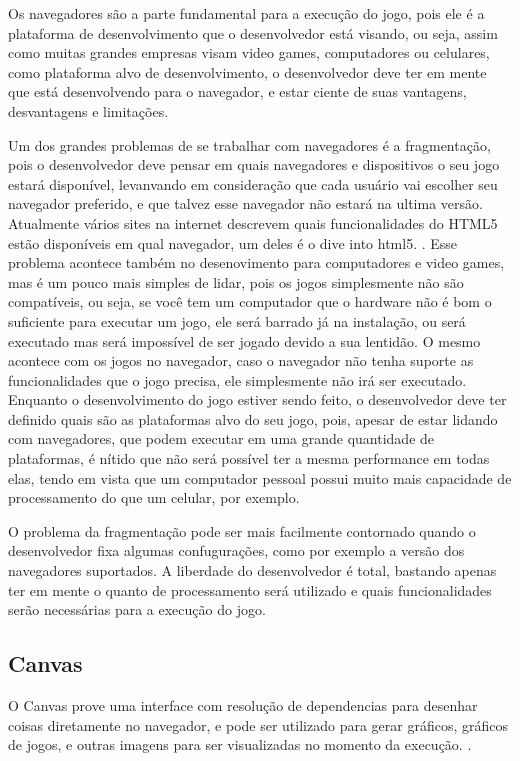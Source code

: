 Os navegadores são a parte fundamental para a execução do jogo, pois
ele é a plataforma de desenvolvimento que o desenvolvedor está visando,
ou seja, assim como muitas grandes empresas visam video games,
computadores ou celulares, como plataforma alvo de desenvolvimento, o
desenvolvedor deve ter em mente que está desenvolvendo para o
navegador, e estar ciente de suas vantagens, desvantagens e
limitações.

Um dos grandes problemas de se trabalhar com navegadores é a
fragmentação, pois o desenvolvedor deve pensar em quais navegadores e
dispositivos o seu jogo estará disponível, levanvando em consideração
que cada usuário vai escolher seu navegador preferido, e que talvez
esse navegador não estará na ultima versão. Atualmente vários sites na
internet descrevem quais funcionalidades do HTML5 estão disponíveis em
qual navegador, um deles é o dive into html5. \cite{diveintohtml5}.
Esse problema acontece também no desenovimento para computadores e
video games, mas é um pouco mais simples de lidar, pois os jogos
simplesmente não são compatíveis, ou seja, se você tem um computador
que o hardware não é bom o suficiente para executar um jogo, ele será
barrado já na instalação, ou será executado mas será impossível de ser
jogado devido a sua lentidão. O mesmo acontece com os jogos no
navegador, caso o navegador não tenha suporte as funcionalidades que o
jogo precisa, ele simplesmente não irá ser executado. Enquanto o
desenvolvimento do jogo estiver sendo feito, o desenvolvedor deve ter
definido quais são as plataformas alvo do seu jogo, pois, apesar de
estar lidando com navegadores, que podem executar em uma grande
quantidade de plataformas, é nítido que não será possível ter a mesma
performance em todas elas, tendo em vista que um computador pessoal
possui muito mais capacidade de processamento do que um celular, por
exemplo.

O problema da fragmentação pode ser mais facilmente contornado quando
o desenvolvedor fixa algumas confugurações, como por exemplo a versão
dos navegadores suportados. A liberdade do desenvolvedor é total,
bastando apenas ter em mente o quanto de processamento será utilizado
e quais funcionalidades serão necessárias para a execução do jogo.

\subsection{Canvas}

O Canvas prove uma interface com resolução de dependencias para
desenhar coisas diretamente no navegador, e pode ser utilizado para
gerar gráficos, gráficos de jogos, e outras imagens para ser
visualizadas no momento da execução. \cite{w3ccanvas}.

